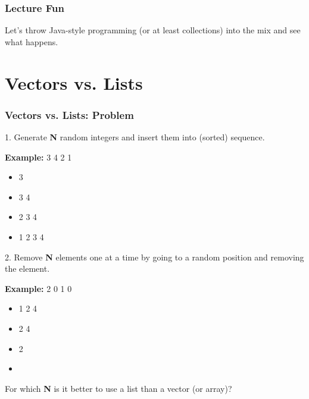 \begin{frame}
  \frametitle{Lecture Fun}

  \begin{center}
\Large
    Let's throw Java-style programming (or at least collections) into the mix and see what happens.
  \end{center}
\end{frame}

\section{Vectors vs. Lists}
\begin{frame}
  \frametitle{Vectors vs. Lists: Problem}
  
  

    1. Generate {\bf N} random integers and insert them into (sorted)
      sequence.
      
  

      {\bf Example:} 3 4 2 1
      
      \begin{itemize}
        \item 3
        \item 3 4
        \item 2 3 4
        \item 1 2 3 4
      \end{itemize}
  

    2. Remove {\bf N} elements one at a time by going to a random position
      and removing the element.

  
      {\bf Example:} 2 0 1 0
      
      \begin{itemize}
        \item 1 2 4
        \item 2 4
        \item 2
        \item 
      \end{itemize}
  
  For which {\bf N} is it better to use a list than a vector (or array)?
  

\end{frame}

